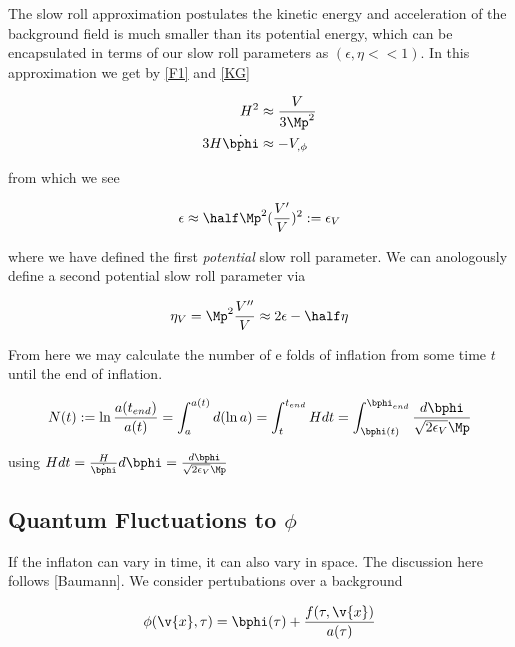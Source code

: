 The slow roll approximation postulates the kinetic energy and acceleration of the background field is much smaller than its potential energy, which can be encapsulated in terms of our slow roll parameters as $(\epsilon, \eta << 1)$. In this approximation we get by \ref{F1} and \ref{KG} 

\begin{equation}\begin{split}
H^2 &\approx \frac{V}{3\Mp^2} \\
3H\dot{\bphi} &\approx -V_{,\phi}
\end{split}\end{equation}

from which we see 

\begin{equation}
\epsilon \approx \half\Mp^2 (\frac{V'}{V})^2 := \epsilon_V
\end{equation}

where we have defined the first \textit{potential} slow roll parameter. We can anologously define a second potential slow roll parameter via

\begin{equation}
\eta_V = \Mp^2 \frac{V''}{V} \approx 2\epsilon - \half\eta
\end{equation}

From here we may calculate the number of e folds of inflation from some time $t$ until the end of inflation. 

\begin{equation}
N(t) := \ln{\frac{a(t_{end})}{a(t)}} = \int_a^{a(t)} d(\ln{a}) = \int_t^{t_{end}} Hdt = \int_{\bphi(t)}^{\bphi_{end}} \frac{d\bphi}{\sqrt{2\epsilon_V}\Mp}
\label{efolds}
\end{equation}

using $Hdt=\frac{H}{\dot{\bphi}}d\bphi=\frac{d\bphi}{\sqrt{2\epsilon_V}\Mp}$

\subsection{Quantum Fluctuations to $\phi$}

If the inflaton can vary in time, it can also vary in space. The discussion here follows [Baumann]. We consider pertubations over a background

\begin{equation}
\phi(\v{x},\tau) = \bphi(\tau) + \frac{f(\tau, \v{x})}{a(\tau)}
\label{phiexpand}
\end{equation}

